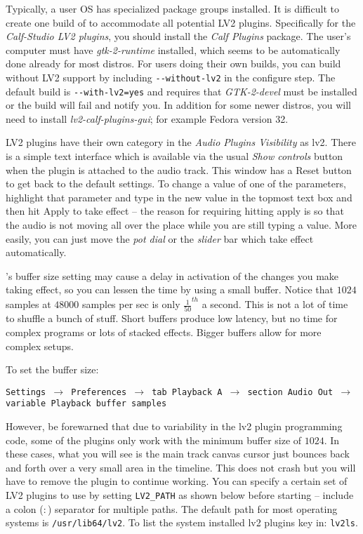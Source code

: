 Typically, a user OS has specialized package groups installed. It is difficult to create one build of \CGG{} to accommodate all potential LV2 plugins. Specifically for the \textit{Calf-Studio LV2 plugins}, you should install the \textit{Calf Plugins} package. The user’s computer must have \textit{gtk-2-runtime} installed, which seems to be automatically done already for most distros. For users doing their own builds, you can build \CGG{} without LV2 support by including \texttt{-{}-without-lv2} in the configure step. The default build is \texttt{-{}-with-lv2=yes} and requires that \textit{GTK-2-devel} must be installed or the build will fail and notify you. In addition for some newer distros, you will need to install
\textit{lv2-calf-plugins-gui}; for example Fedora version 32.

LV2 plugins have their own category in the \textit{Audio Plugins Visibility} as lv2. There is a simple text interface which is available via the usual \textit{Show controls} button when the plugin is attached to the audio track. This window has a Reset button to get back to the default settings. To change a value of one of the parameters, highlight that parameter and type in the new value in the topmost text box and then hit Apply to take effect -- the reason for requiring hitting apply is so that the audio is not moving all over the place while you are still typing a value. More easily, you can just move the \textit{pot dial} or the \textit{slider} bar which take effect automatically.

\CGG{}’s buffer size setting may cause a delay in activation of the changes you make taking effect, so you can lessen the time by using a small buffer. Notice that $1024$ samples at $48000$ samples per sec is only $\frac{1}{50}^{th}$ a second. This is not a lot of time to shuffle a bunch of stuff. Short buffers produce low latency, but no time for complex programs or lots of stacked effects. Bigger buffers allow for more complex setups.

To set the buffer size:

\texttt{Settings $\rightarrow$ Preferences $\rightarrow$ tab Playback A $\rightarrow$ section Audio Out $\rightarrow$ variable Playback buffer samples}

However, be forewarned that due to variability in the lv2 plugin programming code, some of the plugins only work with the minimum buffer size of $1024$. In these cases, what you will see is the main track canvas cursor just bounces back and forth over a very small area in the timeline. This does not crash \CGG{} but you will have to remove the plugin to continue working.
You can specify a certain set of LV2 plugins to use by setting \texttt{LV2\_PATH} as shown below before starting \CGG{} -- include a colon ($:$) separator for multiple paths. The default path for most operating systems is \texttt{/usr/lib64/lv2}. To list the system installed lv2 plugins key in: \texttt{lv2ls}.

